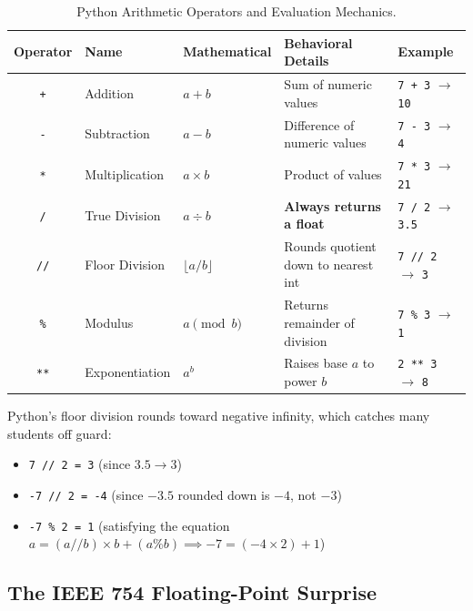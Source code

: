 \begin{table}[htbp]
\centering
\small
\renewcommand{\arraystretch}{1.3}
\begin{tabularx}{\linewidth}{cll>{\raggedright\arraybackslash}Xl}
\toprule
\textbf{Operator} & \textbf{Name} & \textbf{Mathematical} & \textbf{Behavioral Details} & \textbf{Example} \\
\midrule
\texttt{+} & Addition & $a + b$ & Sum of numeric values & \texttt{7 + 3} $\to$ \texttt{10} \\
\texttt{-} & Subtraction & $a - b$ & Difference of numeric values & \texttt{7 - 3} $\to$ \texttt{4} \\
\texttt{*} & Multiplication & $a \times b$ & Product of values & \texttt{7 * 3} $\to$ \texttt{21} \\
\texttt{/} & True Division & $a \div b$ & \textbf{Always returns a float} & \texttt{7 / 2} $\to$ \texttt{3.5} \\
\texttt{//} & Floor Division & $\lfloor a / b \rfloor$ & Rounds quotient down to nearest int & \texttt{7 // 2} $\to$ \texttt{3} \\
\texttt{\%} & Modulus & $a \pmod b$ & Returns remainder of division & \texttt{7 \% 3} $\to$ \texttt{1} \\
\texttt{**} & Exponentiation & $a^b$ & Raises base $a$ to power $b$ & \texttt{2 ** 3} $\to$ \texttt{8} \\
\bottomrule
\end{tabularx}
\caption{Python Arithmetic Operators and Evaluation Mechanics.}
\label{tab:arithmetic-ops}
\end{table}

\begin{examtip}
Python's floor division rounds toward negative infinity, which catches many students off guard:
\begin{itemize}
    \item \texttt{7 // 2 = 3} (since $3.5 \to 3$)
    \item \texttt{-7 // 2 = -4} (since $-3.5$ rounded down is $-4$, not $-3$)
    \item \texttt{-7 \% 2 = 1} (satisfying the equation $a = (a // b) \times b + (a \% b) \implies -7 = (-4 \times 2) + 1$)
\end{itemize}
\end{examtip}

\subsection{The IEEE 754 Floating-Point Surprise}

